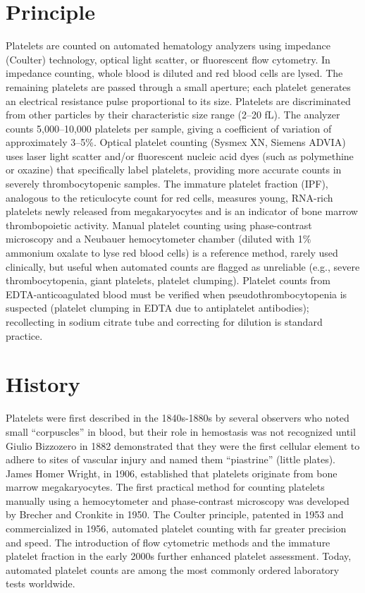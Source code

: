 \section*{Principle}
Platelets are counted on automated hematology analyzers using impedance (Coulter) technology, optical light scatter, or fluorescent flow cytometry. In impedance counting, whole blood is diluted and red blood cells are lysed. The remaining platelets are passed through a small aperture; each platelet generates an electrical resistance pulse proportional to its size. Platelets are discriminated from other particles by their characteristic size range (2--20 fL). The analyzer counts 5,000--10,000 platelets per sample, giving a coefficient of variation of approximately 3--5\%. Optical platelet counting (Sysmex XN, Siemens ADVIA) uses laser light scatter and/or fluorescent nucleic acid dyes (such as polymethine or oxazine) that specifically label platelets, providing more accurate counts in severely thrombocytopenic samples. The immature platelet fraction (IPF), analogous to the reticulocyte count for red cells, measures young, RNA-rich platelets newly released from megakaryocytes and is an indicator of bone marrow thrombopoietic activity. Manual platelet counting using phase-contrast microscopy and a Neubauer hemocytometer chamber (diluted with 1\% ammonium oxalate to lyse red blood cells) is a reference method, rarely used clinically, but useful when automated counts are flagged as unreliable (e.g., severe thrombocytopenia, giant platelets, platelet clumping). Platelet counts from EDTA-anticoagulated blood must be verified when pseudothrombocytopenia is suspected (platelet clumping in EDTA due to antiplatelet antibodies); recollecting in sodium citrate tube and correcting for dilution is standard practice.

\section*{History}
Platelets were first described in the 1840s-1880s by several observers who noted small ``corpuscles'' in blood, but their role in hemostasis was not recognized until Giulio Bizzozero in 1882 demonstrated that they were the first cellular element to adhere to sites of vascular injury and named them ``piastrine'' (little plates). James Homer Wright, in 1906, established that platelets originate from bone marrow megakaryocytes. The first practical method for counting platelets manually using a hemocytometer and phase-contrast microscopy was developed by Brecher and Cronkite in 1950. The Coulter principle, patented in 1953 and commercialized in 1956, automated platelet counting with far greater precision and speed. The introduction of flow cytometric methods and the immature platelet fraction in the early 2000s further enhanced platelet assessment. Today, automated platelet counts are among the most commonly ordered laboratory tests worldwide.

